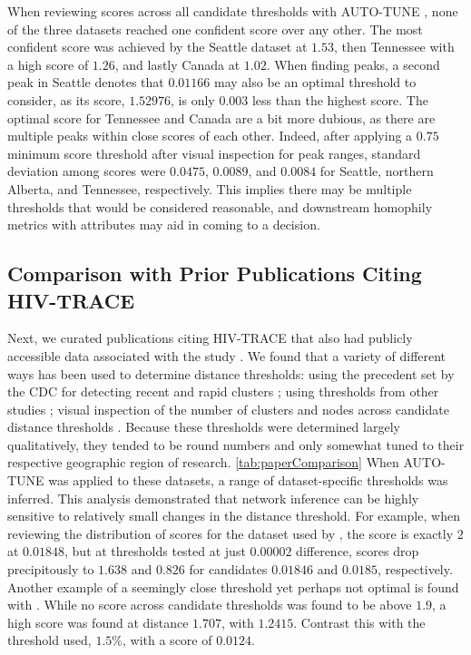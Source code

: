\documentclass[utf8]{FrontiersinHarvard} %
\newcommand{\TODO}[1]{{\color{red}{#1}}}
\begin{document}
When reviewing scores across all candidate thresholds with AUTO-TUNE
\label{fig:clustuner}, none of the three datasets reached one confident score
over any other. The most confident score was achieved by the Seattle dataset at
$1.53$, then Tennessee with a high score of $1.26$, and lastly Canada at
$1.02$. When finding peaks, a second peak in Seattle denotes that $0.01166$
may also be an optimal threshold to consider, as its score, $1.52976$, is only
$0.003$ less than the highest score. The optimal score for Tennessee and Canada
are a bit more dubious, as there are multiple peaks within close scores of each
other. Indeed, after applying a $0.75$ minimum score threshold after visual
inspection for peak ranges, standard deviation among scores were $0.0475$,
$0.0089$, and $0.0084$ for Seattle, northern Alberta, and Tennessee,
respectively. This implies there may be multiple thresholds that would be
considered reasonable, and downstream homophily metrics with attributes may aid
in coming to a decision.

\subsection{Comparison with Prior Publications Citing HIV-TRACE}


Next, we curated publications citing HIV-TRACE that also had publicly
accessible data associated with the study \cite{rhee_national_2019,
brenner_role_2021, h_acquisition_2021, liu_dynamics_2020, bbosa_short_2020,
yan_central_2020, dalai_combining_2018, sivay_hiv-1_2018}. We found that a
variety of different ways has been used to determine distance thresholds:
using the precedent set by the CDC for detecting recent and rapid clusters
\cite{yan_central_2020}; using thresholds from other studies
\cite{sivay_hiv-1_2018}; visual inspection of the number of clusters and nodes
across candidate distance thresholds \cite{liu_dynamics_2020}. Because these thresholds were determined largely qualitatively, they
tended to be round numbers and only somewhat tuned to
their respective geographic region of research. \autoref{tab:paperComparison}
When AUTO-TUNE was applied to these datasets, a range of dataset-specific thresholds was inferred. 
This analysis demonstrated that network inference can be highly sensitive to relatively small changes in the distance threshold.
For example, when reviewing the distribution of scores for the dataset used by
\cite{dalai_combining_2018}, the score is exactly $2$ at $0.01848$, but at
thresholds tested at just $0.00002$ difference, scores drop precipitously to
$1.638$ and $0.826$ for candidates $0.01846$ and $0.0185$, respectively.
Another example of a seemingly close threshold yet perhaps not optimal is found
with \cite{bbosa_short_2020}. While no score across candidate thresholds was
found to be above $1.9$, a high score was found at distance $1.707$, with
$1.2415$. Contrast this with the threshold used, $1.5\%$, with a score of
$0.0124$. \TODO{I would add some specifics here: what is $R_12$ and $C$ for those thresholds, for example? The composite score is difficult to appreciate intutitvely}
\end{document}
